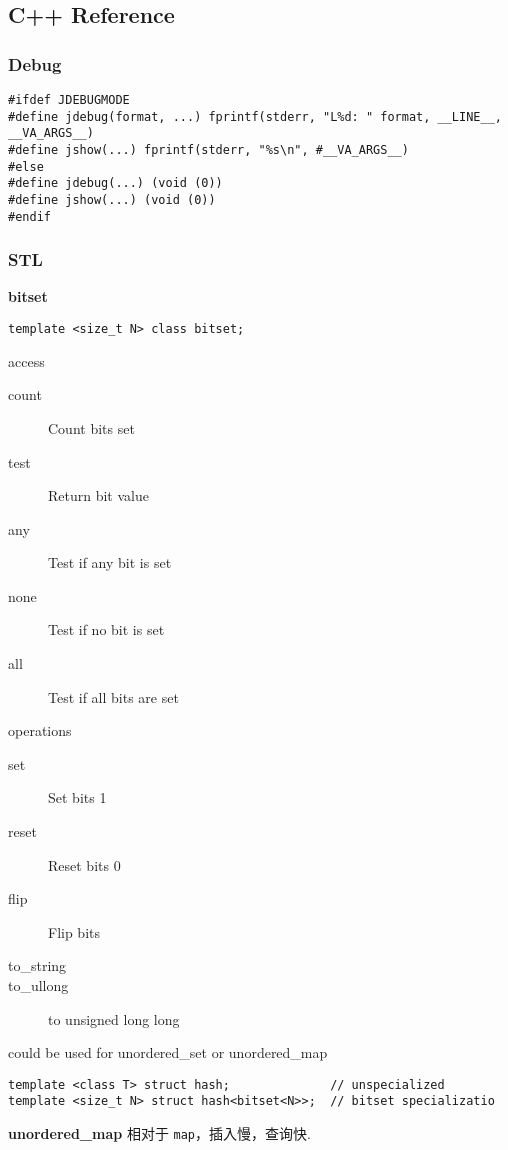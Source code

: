 \subsection{C++ Reference}

\subsubsection{Debug}
\begin{lstlisting}
#ifdef JDEBUGMODE
#define jdebug(format, ...) fprintf(stderr, "L%d: " format, __LINE__, __VA_ARGS__)
#define jshow(...) fprintf(stderr, "%s\n", #__VA_ARGS__)
#else
#define jdebug(...) (void (0))
#define jshow(...) (void (0))
#endif
\end{lstlisting}

\subsubsection{STL}

\textbf{bitset}
\begin{lstlisting}
template <size_t N> class bitset;
\end{lstlisting}

access
\begin{description}
    \item[count] Count bits set
    \item[test] Return bit value
    \item[any] Test if any bit is set
    \item[none] Test if no bit is set
    \item[all] Test if all bits are set
\end{description}
operations
\begin{description}
    \item[set] Set bits 1
    \item[reset] Reset bits 0
    \item[flip] Flip bits
    \item[to\_string]
    \item[to\_ullong] to unsigned long long
\end{description}

could be used for unordered\_set or unordered\_map
\begin{lstlisting}
template <class T> struct hash;              // unspecialized
template <size_t N> struct hash<bitset<N>>;  // bitset specializatio
\end{lstlisting}

\textbf{unordered\_map}
相对于 \verb|map|，插入慢，查询快.

